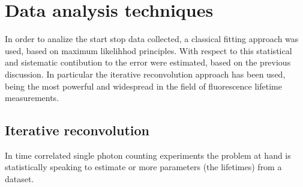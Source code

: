 





\section{Data analysis techniques}
In order to analize the start stop data collected, a classical fitting approach was used, based on maximum likelihhod principles.
With respect to this statistical and sistematic contibution to the error were estimated, based on the previous discussion.
In particular the iterative reconvolution approach has been used, being the most powerful and widespread in the field of fluorescence lifetime measurements.

\subsection{Iterative reconvolution}
In time correlated single photon counting experiments the problem at hand is statistically speaking to estimate or more parameters (the lifetimes) from a dataset.

